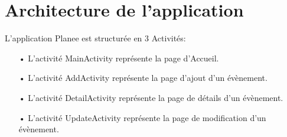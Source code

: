 \documentclass[12pt,a4paper]{report}
\begin{document}
\section{Architecture de l'application}
\begin{flushleft}
\justify
L'application Planee est structurée en 3 Activités:
\begin{itemize}
\item[•] L'activité MainActivity représente la page d'Accueil.
\item[•] L'activité AddActivity représente la page d'ajout d'un évènement.
\item[•] L'activité DetailActivity représente la page de détails d'un évènement.
\item[•] L'activité UpdateActivity représente la page de modification d'un évènement.
\end{itemize}
\end{flushleft}
\end{document}
